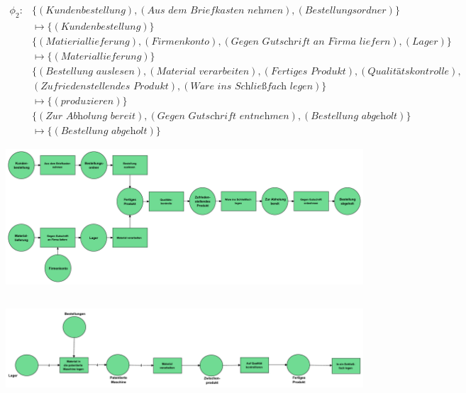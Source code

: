 \documentclass[12pt,a4paper]{../krautsourcing/homework}
\begin{document}
\(
\begin{aligned}
\phi_2:& \{(\textit{Kundenbestellung}), (\textit{Aus dem Briefkasten nehmen}), (\textit{Bestellungsordner})\}\\
&\mapsto \{(\textit{Kundenbestellung})\}\\
&\{(\textit{Matieriallieferung}), (\textit{Firmenkonto}), (\textit{Gegen Gutschrift an Firma liefern}), (\textit{Lager})\} \\
&\mapsto \{(\textit{Materiallieferung})\}\\
&\{(\textit{Bestellung auslesen}), (\textit{Material verarbeiten}), (\textit{Fertiges Produkt}), (\textit{Qualitätskontrolle}),\\
&(\textit{Zufriedenstellendes Produkt}), (\textit{Ware ins Schließfach legen})\} \\
&\mapsto \{(\textit{produzieren})\}\\
&\{(\textit{Zur Abholung bereit}), (\textit{Gegen Gutschrift entnehmen}), (\textit{Bestellung abgeholt})\}\\
&\mapsto \{(\textit{Bestellung abgeholt})\}
\end{aligned}
\)\\
\centerline{
\includegraphics[scale=0.35,trim={0mm 0mm 0mm 0mm},clip]{Aufgabe_7-5/Aufgabe_7-5-1-3.pdf}
}

\subsection{}

\centerline{
\includegraphics[scale=0.35,trim={0mm 0mm 0mm 0mm},clip]{Aufgabe_7-5/Aufgabe_7-5-3.pdf}
}

\subsection{}
\end{document}
